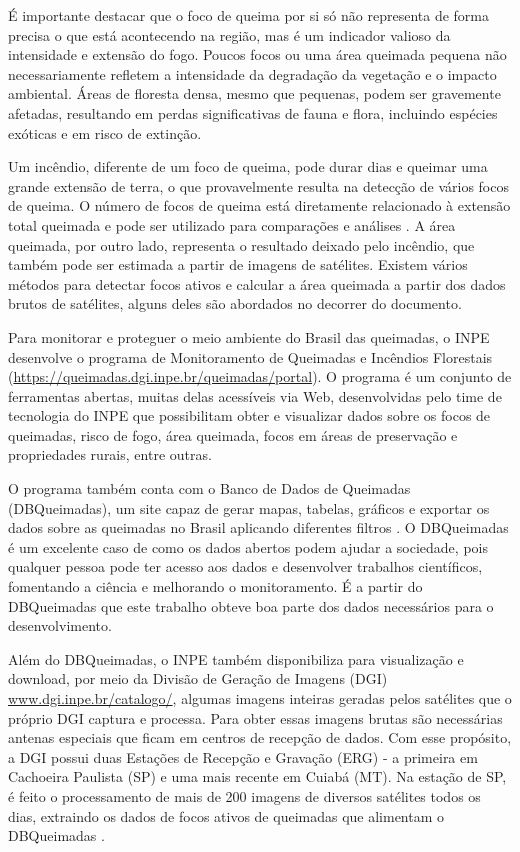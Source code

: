 \documentclass[cic,tc]{iiufrgs}
\begin{document}
É importante destacar que o foco de queima por si só não representa de forma precisa o que está acontecendo na região, mas é um indicador valioso da intensidade e extensão do fogo. Poucos focos ou uma área queimada pequena não necessariamente refletem a intensidade da degradação da vegetação e o impacto ambiental. Áreas de floresta densa, mesmo que pequenas, podem ser gravemente afetadas, resultando em perdas significativas de fauna e flora, incluindo espécies exóticas e em risco de extinção.

Um incêndio, diferente de um foco de queima, pode durar dias e queimar uma grande extensão de terra, o que provavelmente resulta na detecção de vários focos de queima. O número de focos de queima está diretamente relacionado à extensão total queimada e pode ser utilizado para comparações e análises \citep{giglio2010assessing}. A área queimada, por outro lado, representa o resultado deixado pelo incêndio, que também pode ser estimada a partir de imagens de satélites. Existem vários métodos para detectar focos ativos e calcular a área queimada a partir dos dados brutos de satélites, alguns deles são abordados no decorrer do documento. 

Para monitorar e proteguer o meio ambiente do Brasil das queimadas, o INPE desenvolve o programa de Monitoramento de Queimadas e Incêndios Florestais (\url{https://queimadas.dgi.inpe.br/queimadas/portal}). O programa é um conjunto de ferramentas abertas, muitas delas acessíveis via Web, desenvolvidas pelo time de tecnologia do INPE que possibilitam obter e visualizar dados sobre os focos de queimadas, risco de fogo, área queimada, focos em áreas de preservação e propriedades rurais, entre outras.

O programa também conta com o Banco de Dados de Queimadas (DBQueimadas), um site capaz de gerar mapas, tabelas, gráficos e exportar os dados sobre as queimadas no Brasil aplicando diferentes filtros \citep{setzer2019banco}. O DBQueimadas é um excelente caso de como os dados abertos podem ajudar a sociedade, pois qualquer pessoa pode ter acesso aos dados e desenvolver trabalhos científicos, fomentando a ciência e melhorando o monitoramento. É a partir do DBQueimadas que este trabalho obteve boa parte dos dados necessários para o desenvolvimento.

Além do DBQueimadas, o INPE também disponibiliza para visualização e download, por meio da Divisão de Geração de Imagens (DGI) \url{www.dgi.inpe.br/catalogo/}, algumas imagens inteiras geradas pelos satélites que o próprio DGI captura e processa. Para obter essas imagens brutas são necessárias antenas especiais que ficam em centros de recepção de dados. Com esse propósito, a DGI possui duas Estações de Recepção e Gravação (ERG) - a primeira em Cachoeira Paulista (SP) e uma mais recente em Cuiabá (MT). Na estação de SP, é feito o processamento de mais de 200 imagens de diversos satélites todos os dias, extraindo os dados de focos ativos de queimadas que alimentam o DBQueimadas \citep{SiteDGI}. \par
\end{document}
